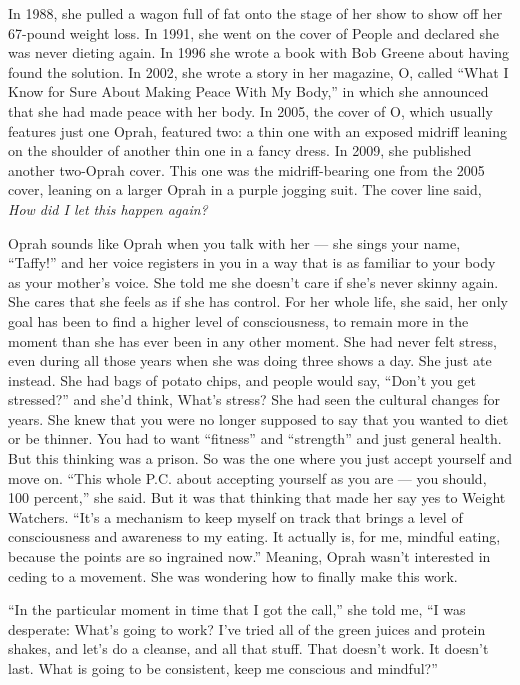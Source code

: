 In 1988, she pulled a wagon full of fat onto the stage of her show to
show off her 67-pound weight loss. In 1991, she went on the cover of
People and declared she was never dieting again. In 1996 she wrote a
book with Bob Greene about having found the solution. In 2002, she wrote
a story in her magazine, O, called ``What I Know for Sure About Making
Peace With My Body,'' in which she announced that she had made peace
with her body. In 2005, the cover of O, which usually features just one
Oprah, featured two: a thin one with an exposed midriff leaning on the
shoulder of another thin one in a fancy dress. In 2009, she published
another two-Oprah cover. This one was the midriff-bearing one from the
2005 cover, leaning on a larger Oprah in a purple jogging suit. The
cover line said, \emph{How did I let this happen again?}

Oprah sounds like Oprah when you talk with her --- she sings your name,
``Taffy!'' and her voice registers in you in a way that is as familiar
to your body as your mother's voice. She told me she doesn't care if
she's never skinny again. She cares that she feels as if she has
control. For her whole life, she said, her only goal has been to find a
higher level of consciousness, to remain more in the moment than she has
ever been in any other moment. She had never felt stress, even during
all those years when she was doing three shows a day. She just ate
instead. She had bags of potato chips, and people would say, ``Don't you
get stressed?'' and she'd think, What's stress? She had seen the
cultural changes for years. She knew that you were no longer supposed to
say that you wanted to diet or be thinner. You had to want ``fitness''
and ``strength'' and just general health. But this thinking was a
prison. So was the one where you just accept yourself and move on.
``This whole P.C. about accepting yourself as you are --- you should,
100 percent,'' she said. But it was that thinking that made her say yes
to Weight Watchers. ``It's a mechanism to keep myself on track that
brings a level of consciousness and awareness to my eating. It actually
is, for me, mindful eating, because the points are so ingrained now.''
Meaning, Oprah wasn't interested in ceding to a movement. She was
wondering how to finally make this work.

``In the particular moment in time that I got the call,'' she told me,
``I was desperate: What's going to work? I've tried all of the green
juices and protein shakes, and let's do a cleanse, and all that stuff.
That doesn't work. It doesn't last. What is going to be consistent, keep
me conscious and mindful?''

